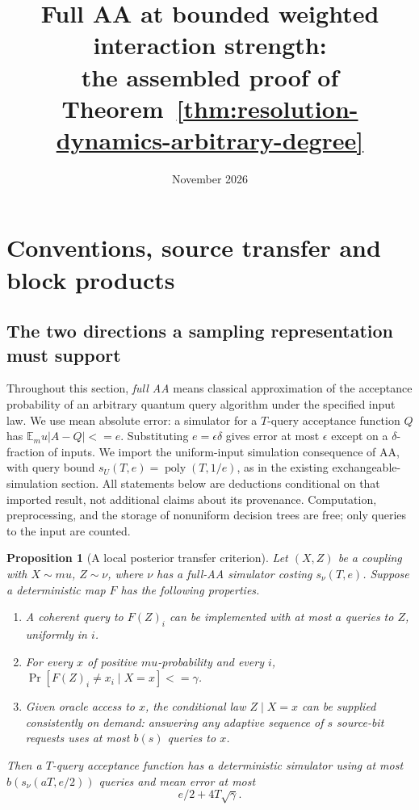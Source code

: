 \documentclass[11pt]{article}
\title{Full AA at bounded weighted interaction strength:\\ the assembled proof of Theorem~\ref{thm:resolution-dynamics-arbitrary-degree}}
\author{}
\date{November 2026}
\newtheorem{proposition}[theorem]{Proposition}
\theoremstyle{definition}
\theoremstyle{remark}
\def\mu{mu}\def\rho{rho}\def\le{<=}\def\ge{>=}%
\begin{document}
\maketitle
\thispagestyle{fancy}
\tableofcontents
\clearpage
\section{Conventions, source transfer and block products}

\subsection{The two directions a sampling representation must support}
\label{sec:threshold-positive-transfer}

Throughout this section, \emph{full AA} means classical approximation of
the acceptance probability of an arbitrary quantum query algorithm under
the specified input law. We use mean absolute error: a simulator for a
\(T\)-query acceptance function \(Q\) has
\(\mathbb E_\mu|A-Q|\le e\). Substituting \(e=\epsilon\delta\) gives
error at most \(\epsilon\) except on a \(\delta\)-fraction of inputs.
We import the uniform-input simulation consequence of AA, with query
bound \(s_U(T,e)=\operatorname{poly}(T,1/e)\), as in the existing
exchangeable-simulation section. All statements below are deductions
conditional on that imported result, not additional claims about its
provenance. Computation, preprocessing, and the storage of nonuniform
decision trees are free; only queries to the input are counted.

\begin{proposition}[A local posterior transfer criterion]
\label{prop:threshold-local-posterior}
Let \((X,Z)\) be a coupling with \(X\sim\mu\), \(Z\sim\nu\), where
\(\nu\) has a full-AA simulator costing \(s_\nu(T,e)\). Suppose a
deterministic map \(F\) has the following properties.
\begin{enumerate}
\item A coherent query to \(F(Z)_i\) can be implemented with at most
\(a\) queries to \(Z\), uniformly in \(i\).
\item For every \(x\) of positive \(\mu\)-probability and every \(i\),
\(\Pr[F(Z)_i\ne x_i\mid X=x]\le\gamma\).
\item Given oracle access to \(x\), the conditional law \(Z\mid X=x\)
can be supplied consistently on demand: answering any adaptive sequence
of \(s\) source-bit requests uses at most \(b(s)\) queries to \(x\).
\end{enumerate}
Then a \(T\)-query acceptance function has a deterministic simulator
using at most \(b(s_\nu(aT,e/2))\) queries and mean error at most
\[
 e/2+4T\sqrt\gamma.
\]
\end{proposition}
\end{document}
